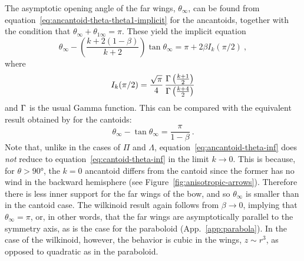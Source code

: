 The asymptotic opening angle
of the far wings, \(\theta_\infty\), can be found from
equation~\eqref{eq:ancantoid-theta-theta1-implicit} for the
ancantoids, together with the condition that
\(\theta_\infty + \theta_{1\infty} = \pi\).  These yield the implicit equation
\begin{equation}
  \label{eq:ancantoid-theta-inf}
  \theta_\infty - \left( \frac {k + 2 (1 - \beta)} {k + 2} \right) \tan \theta_\infty
  = \pi + 2 \beta I_k(\pi/2) \ ,
\end{equation}
where
\begin{equation}
  I_k(\pi/2) = \frac{\sqrt \pi}{4} \,
      \frac{  \operatorname{\Gamma}\left( \frac{k+1}{2} \right)} {\operatorname{\Gamma}\left(\frac{k+4}{2}\right)}
\end{equation}
and \(\operatorname{\Gamma}\) is the usual Gamma function.  This can be compared with the equivalent result obtained by \CRW{} for the cantoids:
\begin{equation}
  \label{eq:cantoid-theta-inf}
  \theta_\infty - \tan \theta_\infty = \frac{\pi}{1 - \beta} \ .
\end{equation}
Note that, unlike in the cases of \(\Pi\) and \(\Lambda\),
equation~\eqref{eq:ancantoid-theta-inf} does \emph{not} reduce to
equation~\eqref{eq:cantoid-theta-inf} in the limit \(k \to 0\).  This is
because, for \(\theta > \ang{90}\), the \(k = 0\) ancantoid differs from the
cantoid since the former has no wind in the backward hemisphere (see
Figure~\ref{fig:anisotropic-arrows}).  Therefore there is less inner
support for the far wings of the bow, and so \(\theta_\infty\) is smaller than
in the cantoid case.  The wilkinoid result again follows from
\(\beta \to 0\), implying that \(\theta_\infty = \pi\), or, in other words, that the far
wings are asymptotically parallel to the symmetry axis, as is the case
for the paraboloid (App.~\ref{app:parabola}).  In the case of the
wilkinoid, however, the behavior is cubic in the wings,
\(z \sim r^3\), as opposed to quadratic as in the paraboloid.
